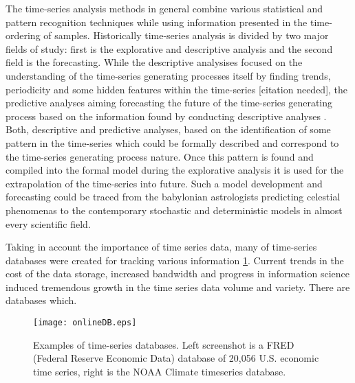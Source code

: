The time-series analysis methods in general combine various statistical and pattern recognition techniques while using information presented in the time-ordering of samples. Historically time-series analysis is divided by two major fields of study: first is the explorative and descriptive analysis and the second field is the forecasting. 
While the descriptive analysises focused on the understanding of the time-series generating processes itself by finding trends, periodicity and some hidden features within the time-series [citation needed], the predictive analyses aiming forecasting the future of the time-series generating process based on the information found by conducting descriptive analyses \cite{citeulike:3449765}. 
Both, descriptive and predictive analyses, based on the identification of some pattern in the time-series which could be formally described and correspond to the time-series generating process nature. Once this pattern is found and compiled into the formal model during the explorative analysis it is used for the extrapolation of the time-series into future. Such a model development and forecasting could be traced from the babylonian astrologists predicting celestial phenomenas to the contemporary stochastic and deterministic models in almost every scientific field.

Taking in account the importance of time series data, many of time-series databases were created for tracking various information \ref{fig:onlineDB}. Current trends in the cost of the data storage, increased bandwidth and progress in information science induced tremendous growth in the time series data volume and variety. There are databases which. 

\begin{figure}[tbp]
   \centering
   \texttt{[image: onlineDB.eps]}
   \caption{Examples of time-series databases. Left screenshot is a FRED (Federal Reserve Economic Data) database of 20,056 U.S. economic time series, right is the NOAA Climate timeseries database.}
   \label{fig:onlineDB}
\end{figure} 
